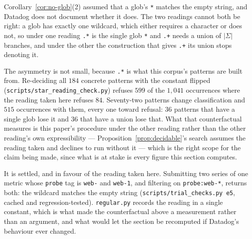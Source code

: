 \begin{remark}%
\label{rem:star-empty}
Corollary~\ref{cor:no-glob}(2) assumed that a glob's \texttt{*} matches the empty
string, and Datadog does not document whether it does. The two readings cannot both be
right: a glob has exactly one wildcard, which either requires a character or does not,
so under one reading \texttt{.*} is the single glob \texttt{*} and \texttt{.+} needs a
union of $|\Sigma|$ branches, and under the other the construction that gives
\texttt{.+} its union stops denoting it.

The asymmetry is not small, because \texttt{.*} is what this corpus's patterns are
built from. Re-deciding all $184$ concrete patterns with the constant flipped
(\texttt{scripts\slash star\_reading\_check.py}) refuses $599$ of the $1{,}041$
occurrences where the reading taken here refuses $84$. Seventy-two patterns change
classification and $515$ occurrences with them, every one toward refusal: $36$ patterns
that have a single glob lose it and $36$ that have a union lose that. What that
counterfactual measures is this paper's procedure under the other reading rather than
the other reading's own expressibility --- Proposition~\ref{prop:decidable}'s search
assumes the reading taken and declines to run without it --- which is the right scope
for the claim being made, since what is at stake is every figure this section computes.

It is settled, and in favour of the reading taken here. Submitting two series of one
metric whose \texttt{probe} tag is \texttt{web-} and \texttt{web-1}, and filtering on
\texttt{probe:web-*}, returns both: the wildcard matches the empty string
(\texttt{scripts\slash trial\_checks.py e5}, cached and regression-tested).
\texttt{regular.py} records the reading in a single constant, which is what made the
counterfactual above a measurement rather than an argument, and what would let the
section be recomputed if Datadog's behaviour ever changed.
\end{remark}
